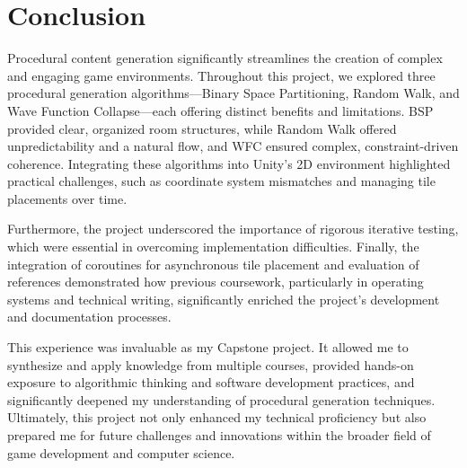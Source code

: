 \documentclass[a4paper, 12pt, one column, aas_macros]{article}
\begin{document}
\section{Conclusion}
Procedural content generation significantly streamlines the creation of complex and engaging game environments. Throughout this project, we explored three procedural generation algorithms---Binary Space Partitioning, Random Walk, and Wave Function Collapse---each offering distinct benefits and limitations. BSP provided clear, organized room structures, while Random Walk offered unpredictability and a natural flow, and WFC ensured complex, constraint-driven coherence. Integrating these algorithms into Unity's 2D environment highlighted practical challenges, such as coordinate system mismatches and managing tile placements over time.

Furthermore, the project underscored the importance of rigorous iterative testing, which were essential in overcoming implementation difficulties. Finally, the integration of coroutines for asynchronous tile placement and evaluation of references demonstrated how previous coursework, particularly in operating systems and technical writing, significantly enriched the project's development and documentation processes.

This experience was invaluable as my Capstone project. It allowed me to synthesize and apply knowledge from multiple courses, provided hands-on exposure to algorithmic thinking and software development practices, and significantly deepened my understanding of procedural generation techniques. Ultimately, this project not only enhanced my technical proficiency but also prepared me for future challenges and innovations within the broader field of game development and computer science.


\end{document}
